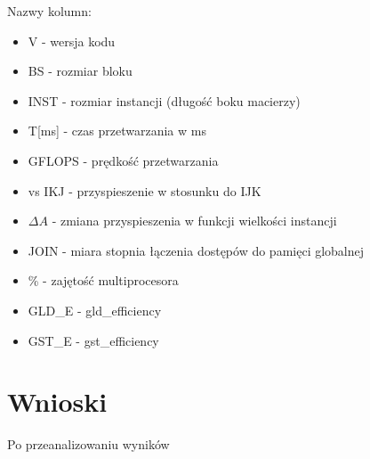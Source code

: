 \documentclass[10pt,a4paper]{article}
\begin{document}
Nazwy kolumn:
\begin{itemize}
	\item V - wersja kodu 
	\item BS - rozmiar bloku 
	\item INST - rozmiar instancji (długość boku macierzy)
	\item T[ms] - czas przetwarzania w ms 
	\item GFLOPS - prędkość przetwarzania
	\item vs IKJ - przyspieszenie w stosunku do IJK 
	\item $\Delta A$ - zmiana przyspieszenia w funkcji wielkości instancji
	\item JOIN - miara stopnia łączenia dostępów do pamięci globalnej
	\item \% - zajętość multiprocesora
	\item GLD\_E - gld\_efficiency 
	\item GST\_E - gst\_efficiency
\end{itemize}


\section{Wnioski}
Po przeanalizowaniu wyników
\end{document}
